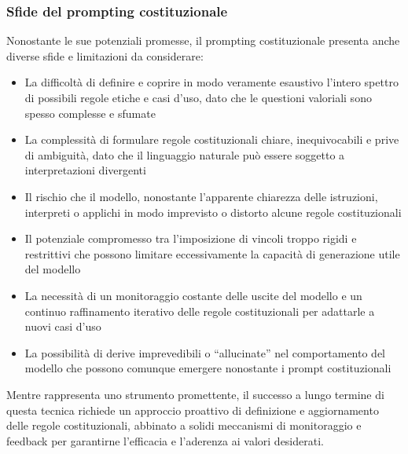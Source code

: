         \subsubsection{Sfide del prompting costituzionale}
            Nonostante le sue potenziali promesse, il prompting costituzionale presenta anche diverse sfide e limitazioni da considerare:
            \begin{itemize}
                \item La difficoltà di definire e coprire in modo veramente esaustivo l'intero spettro di possibili regole etiche e casi d'uso, dato che le questioni valoriali sono spesso complesse e sfumate
                \item La complessità di formulare regole costituzionali chiare, inequivocabili e prive di ambiguità, dato che il linguaggio naturale può essere soggetto a interpretazioni divergenti
                \item Il rischio che il modello, nonostante l'apparente chiarezza delle istruzioni, interpreti o applichi in modo imprevisto o distorto alcune regole costituzionali
                \item Il potenziale compromesso tra l'imposizione di vincoli troppo rigidi e restrittivi che possono limitare eccessivamente la capacità di generazione utile del modello
                \item La necessità di un monitoraggio costante delle uscite del modello e un continuo raffinamento iterativo delle regole costituzionali per adattarle a nuovi casi d'uso
                \item La possibilità di derive imprevedibili o ``allucinate'' nel comportamento del modello che possono comunque emergere nonostante i prompt costituzionali
            \end{itemize}
            
            Mentre rappresenta uno strumento promettente, il successo a lungo termine di questa tecnica richiede un approccio proattivo di definizione e aggiornamento delle regole costituzionali, abbinato a solidi meccanismi di monitoraggio e feedback per garantirne l'efficacia e l'aderenza ai valori desiderati.
        
